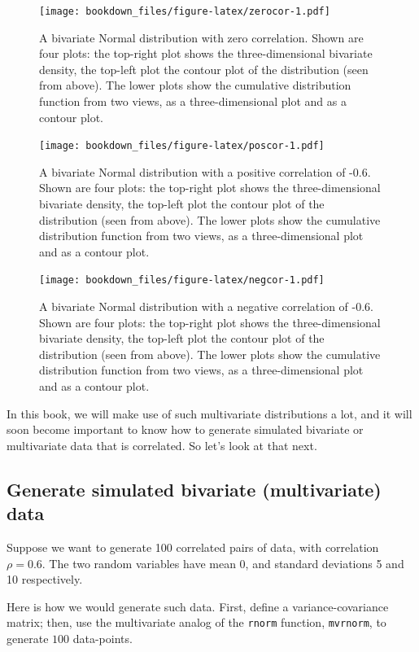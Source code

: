\documentclass[12pt,]{krantz}
\theoremstyle{definition}
\theoremstyle{definition}
\theoremstyle{definition}
\theoremstyle{remark}
\begin{document}
\begin{figure}
\centering
\texttt{[image: bookdown\_files/figure-latex/zerocor-1.pdf]}
\caption{\label{fig:zerocor}A bivariate Normal distribution with zero
correlation. Shown are four plots: the top-right plot shows the
three-dimensional bivariate density, the top-left plot the contour plot
of the distribution (seen from above). The lower plots show the
cumulative distribution function from two views, as a three-dimensional
plot and as a contour plot.}
\end{figure}

\begin{figure}
\centering
\texttt{[image: bookdown\_files/figure-latex/poscor-1.pdf]}
\caption{\label{fig:poscor}A bivariate Normal distribution with a positive
correlation of -0.6. Shown are four plots: the top-right plot shows the
three-dimensional bivariate density, the top-left plot the contour plot
of the distribution (seen from above). The lower plots show the
cumulative distribution function from two views, as a three-dimensional
plot and as a contour plot.}
\end{figure}

\begin{figure}
\centering
\texttt{[image: bookdown\_files/figure-latex/negcor-1.pdf]}
\caption{\label{fig:negcor}A bivariate Normal distribution with a negative
correlation of -0.6. Shown are four plots: the top-right plot shows the
three-dimensional bivariate density, the top-left plot the contour plot
of the distribution (seen from above). The lower plots show the
cumulative distribution function from two views, as a three-dimensional
plot and as a contour plot.}
\end{figure}

In this book, we will make use of such multivariate distributions a lot,
and it will soon become important to know how to generate simulated
bivariate or multivariate data that is correlated. So let's look at that
next.

\subsection{Generate simulated bivariate (multivariate)
data}\label{generate-simulated-bivariate-multivariate-data}

Suppose we want to generate 100 correlated pairs of data, with
correlation \(\rho=0.6\). The two random variables have mean 0, and
standard deviations 5 and 10 respectively.

Here is how we would generate such data. First, define a
variance-covariance matrix; then, use the multivariate analog of the
\texttt{rnorm} function, \texttt{mvrnorm}, to generate \(100\)
data-points.
\end{document}
